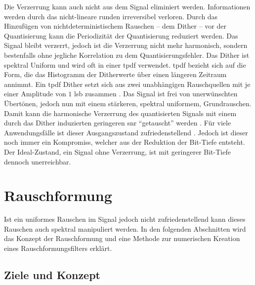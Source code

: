 Die Verzerrung kann auch nicht aus dem Signal eliminiert werden.
Informationen werden durch das nicht-lineare runden irreversibel verloren.
Durch das Hinzufügen von nichtdeterministischem Rauschen -- dem Dither -- vor der Quantisierung kann die Periodizität der Quantisierung reduziert werden.
Das Signal bleibt verzerrt, jedoch ist die Verzerrung nicht mehr harmonisch, sondern bestenfalls ohne jegliche Korrelation zu dem Quantisierungsfehler.
Das Dither ist spektral Uniform und wird oft in einer \gls{tpdf} verwendet.
\gls{tpdf} bezieht sich auf die Form, die das Histogramm der Ditherwerte über einen längeren Zeitraum annimmt.
Ein \gls{tpdf} Dither setzt sich aus zwei unabhängigen Rauschquellen mit je einer Amplitude von $1$ \gls{lsb} zusammen \autocite[S. 507 f.]{dither}\autocite[S. 23 ff. und S. 30 ff.]{dsp-guide}.
Das Signal ist frei von unerwünschten Übertönen, jedoch nun mit einem stärkeren, spektral uniformem, Grundrauschen.
Damit kann die harmonische Verzerrung des quantisierten Signals mit einem durch das Dither induzierten geringeren \gls{snr} \enquote{getauscht} werden \autocite[S. 147]{noise-shaping}.
Für viele Anwendungsfälle ist dieser Ausgangszustand zufriedenstellend \autocite[S. 514]{dither}.
Jedoch ist dieser noch immer ein Kompromiss, welcher aus der Reduktion der Bit-Tiefe entsteht.
Der Ideal-Zustand, ein Signal ohne Verzerrung, ist mit geringerer Bit-Tiefe dennoch unerreichbar.

\section{Rauschformung}

Ist ein uniformes Rauschen im Signal jedoch nicht zufriedenstellend kann dieses Rauschen auch spektral manipuliert werden.
In den folgenden Abschnitten wird das Konzept der Rauschformung und eine Methode zur numerischen Kreation eines Rauschformungsfilters erklärt.

\subsection{Ziele und Konzept}

